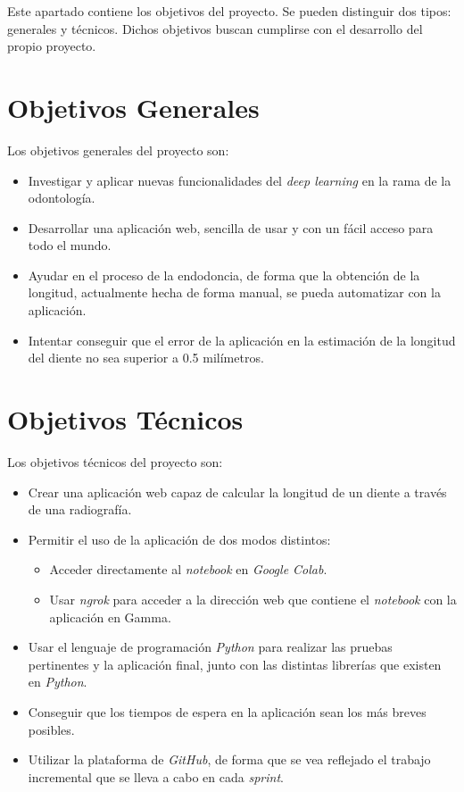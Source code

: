
Este apartado contiene los objetivos del proyecto. Se pueden distinguir dos tipos: generales y técnicos. Dichos objetivos buscan cumplirse con el desarrollo del propio proyecto.

\section{Objetivos Generales}
Los objetivos generales del proyecto son:
\begin{itemize}
    \item Investigar y aplicar nuevas funcionalidades del \emph{deep learning} en la rama de la odontología.
    \item Desarrollar una aplicación web, sencilla de usar y con un fácil acceso para todo el mundo.
    \item Ayudar en el proceso de la endodoncia, de forma que la obtención de la longitud, actualmente hecha de forma manual, se pueda automatizar con la aplicación.
    \item Intentar conseguir que el error de la aplicación en la estimación de la longitud del diente no sea superior a 0.5 milímetros.
\end{itemize}

\section{Objetivos Técnicos}
Los objetivos técnicos del proyecto son:
\begin{itemize}
    \item Crear una aplicación web capaz de calcular la longitud de un diente a través de una radiografía.
    \item Permitir el uso de la aplicación de dos modos distintos:
    \begin{itemize}
        \item Acceder directamente al \emph{notebook} en \emph{Google Colab}.
        \item Usar \emph{ngrok} para acceder a la dirección web que contiene el \emph{notebook} con la aplicación en Gamma.
    \end{itemize}
    \item Usar el lenguaje de programación \emph{Python} para realizar las pruebas pertinentes y la aplicación final, junto con las distintas librerías que existen en \emph{Python}.
    \item Conseguir que los tiempos de espera en la aplicación sean los más breves posibles.
    \item Utilizar la plataforma de \emph{GitHub}, de forma que se vea reflejado el trabajo incremental que se lleva a cabo en cada \emph{sprint}.
\end{itemize}

